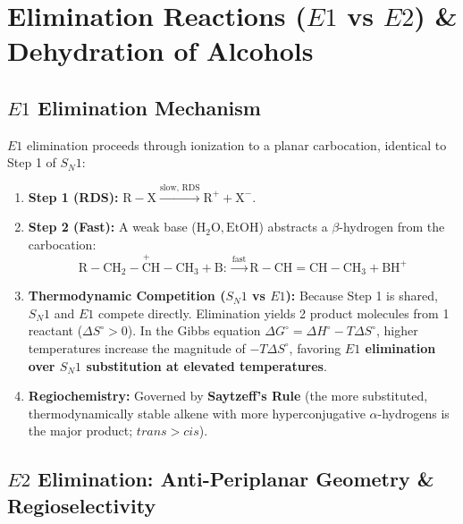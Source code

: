 \documentclass[10pt,twoside,openright]{book}
\begin{document}
\newpage
\section{Elimination Reactions (\texorpdfstring{$E1$}{E1} vs \texorpdfstring{$E2$}{E2}) \& Dehydration of Alcohols}

\subsection{\texorpdfstring{$E1$}{E1} Elimination Mechanism}

\begin{conceptbox}
$E1$ elimination proceeds through ionization to a planar carbocation, identical to Step 1 of $S_N1$:
\begin{enumerate}[leftmargin=*]
  \item \textbf{Step 1 (RDS):} $\mathrm{R-X} \xrightarrow{\text{slow, RDS}} \mathrm{R}^+ + \mathrm{X}^-$.
  \item \textbf{Step 2 (Fast):} A weak base ($\mathrm{H_2O, EtOH}$) abstracts a $\beta$-hydrogen from the carbocation:
  \begin{equation}
    \mathrm{R-CH_2-\overset{+}{C}H-CH_3} + \mathrm{B:} \xrightarrow{\text{fast}} \mathrm{R-CH=CH-CH_3} + \mathrm{BH}^+
  \end{equation}
  \item \textbf{Thermodynamic Competition ($S_N1$ vs $E1$):} Because Step 1 is shared, $S_N1$ and $E1$ compete directly. Elimination yields 2 product molecules from 1 reactant ($\Delta S^\circ > 0$). In the Gibbs equation $\Delta G^\circ = \Delta H^\circ - T\Delta S^\circ$, higher temperatures increase the magnitude of $-T\Delta S^\circ$, favoring \textbf{$E1$ elimination over $S_N1$ substitution at elevated temperatures}.
  \item \textbf{Regiochemistry:} Governed by \textbf{Saytzeff's Rule} (the more substituted, thermodynamically stable alkene with more hyperconjugative $\alpha$-hydrogens is the major product; $trans > cis$).
\end{enumerate}
\end{conceptbox}

\subsection{\texorpdfstring{$E2$}{E2} Elimination: Anti-Periplanar Geometry \& Regioselectivity}
\end{document}

